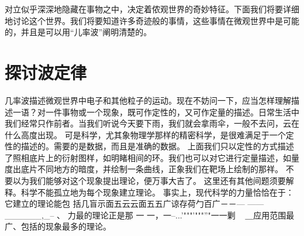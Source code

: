 对立似乎深深地隐藏在事物之中，决定着侬观世界的奇妙特征。下面我们将要详细地讨论这个世界。我们将要知道许多奇迹般的事情，这些事情在微观世界中是可能的，并且是可以用“儿率波”阐明清楚的。

\section{探讨波定律}
几率波描述微观世界中电子和其他粒子的运动。现在不妨问一下，应当怎样理解描述一语？对一件事物或一个现象，既可作定性的，又可作定量的描述。日常生活中我们经常只作前者。当我们听说今天要下雨，我们就会拿雨伞，一般不去问，云在什么高度出现。
可是科学，尤其象物理学那样的精密科学，是很难满足于一个定性的描述的。需要的是数据，而且是准确的数据。
上面我们只以定性的方式描述了照相底片上的衍射图样，如明睹相间的环。我们也可以对它进行定量描述，如量度出底片不同地方的暗度，并绘制一条曲线，正象我们在靶场上绘制的那祥。
不要以为我们能够对这个现象提出理论，便万事大吉了。
这里还有其他间题须要解释。科学不能孤立地为每个现象建立理论。
事实上，现代科学的力量恰恰在于：它建立的理论能包
	括几盲示面五云云面五五广谅存荷勹百广－－—	—---
______,_--
	、	力最的理论正是那
	一	一，一--...'"""'"""''"一一剿	~
＿应用范围最广、包括的现象最多的理论。

